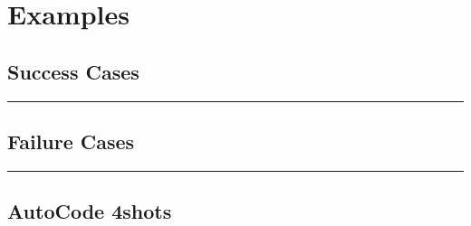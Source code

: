 \begin{table*}[ht]
\caption{\small \textbf{Distribution of Multi-Round Responses.}}
\centering
\small
{}\label{tab_multiround}

\end{table*}



\section{Examples}
\label{sec:appendix:examples}

\subsection{Success Cases}
\label{sec:appendix:examples:success}


\vspace{10pt}
\noindent\rule{\textwidth}{0.4pt} 
\subsection{Failure Cases}
\label{sec:appendix:examples:fail}



\vspace{10pt}
\noindent\rule{\textwidth}{0.4pt} 
\subsection{AutoCode 4shots}\label{list_autocode_prompt}
